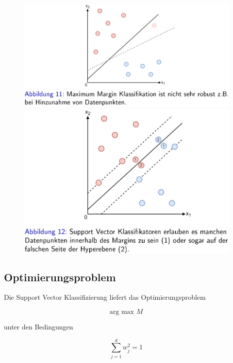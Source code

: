 \documentclass{report}
\begin{document}
  \begin{figure}[H]	
    \centering	
    \begin{minipage}[b]{0.4\textwidth}	
      \includegraphics[scale=.265]{ml06_11}	
    \end{minipage}	
    \hfill	
    \begin{minipage}[b]{0.4\textwidth}	
      \includegraphics[scale=.275]{ml06_12}	
    \end{minipage}	
  \end{figure}	
  
  \subsection{Optimierungsproblem}	
  
  Die Support Vector Klassifizierung liefert das Optimierungsproblem	
  
  $$\text{arg max } M$$	
  
  unter den Bedingungen	
  
  $$\sum_{j=1}^dw_j^2 = 1$$	
  
\end{document}
